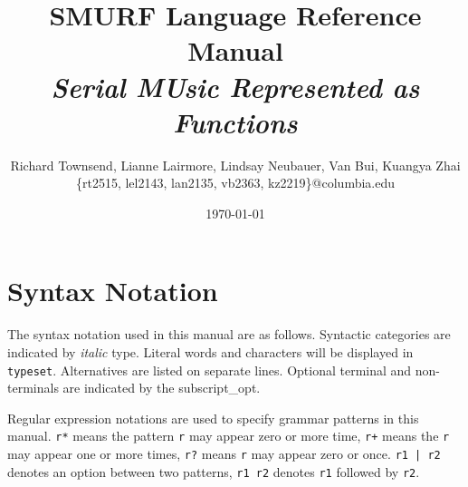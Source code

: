 \documentclass[dvips, 12pt]{article}
\title{{\Huge \bfseries SMURF Language Reference Manual} \\ \Large \it Serial MUsic Represented as Functions \vspace{0.6cm}}
\author{\normalsize Richard Townsend, Lianne Lairmore, Lindsay Neubauer, Van Bui, Kuangya Zhai
	\\ \small \{rt2515, lel2143, lan2135, vb2363, kz2219\}@columbia.edu \vspace{0.6cm}}
\date{\today \vspace{2cm}}
\begin{document}
\maketitle
\clearpage


\tableofcontents

\section{Syntax Notation}
The syntax notation used in this manual are as follows. Syntactic 
categories are indicated by \emph{italic} type. Literal words and 
characters will be displayed in \texttt{typeset}. Alternatives are listed 
on separate lines. Optional terminal and non-terminals are indicated by the
subscript\_{opt}. 

Regular expression notations are used to specify grammar patterns in this
manual.  \texttt{r*} means the pattern \texttt{r} may appear zero or more time,
\texttt{r+} means the \texttt{r} may appear one or more times, \texttt{r?}
means \texttt{r} may appear zero or once. \texttt{r1 | r2} denotes an option
between two patterns, \texttt{r1 r2} denotes \texttt{r1} followed by
\texttt{r2}. 








\clearpage



\end{document}
